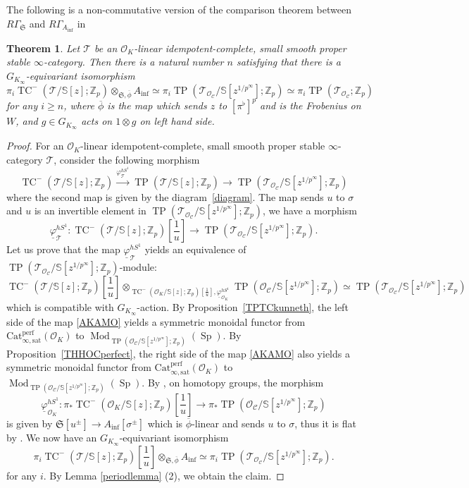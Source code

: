 \documentclass[11pt]{amsart}
\newcommand{\Z}{\mathbb{Z}}
\newcommand{\sO}{\mathcal{O}}
\newcommand{\sT}{\mathcal{T}}
\newcommand{\bS}{\mathbb{S}}
\newcommand{\Mod}{\operatorname{Mod}}
\newcommand{\TP}{\operatorname{TP}}
\newcommand{\TCn}{\operatorname{TC}^{-}}
\newcommand{\ol}{\overline}
\newcommand{\Ainf}{A_{\operatorname{inf}}}
\newcommand{\Cu}{\mathcal{C}}
\newcommand{\mS}{\mathfrak{S}}
\newcommand{\Catsat}{\operatorname{Cat_{\infty,sat}^{perf}}}
\newcommand{\Sp}{\operatorname{Sp}}
\newtheorem{thm}[lemma]{Theorem}
\theoremstyle{definition}
\theoremstyle{remark}
\numberwithin{equation}{section}
\begin{document}
The following is a non-commutative version of the comparison theorem between $R\Gamma_\mS$ and $R\Gamma_{\Ainf}$ in \cite[Theorem 1.2 (1)]{BMS2}
\begin{thm}\label{TPTCcomp}
Let $\sT$ be an $\sO_K$-linear idempotent-complete, small smooth proper stable $\infty$-category. Then there is a natural number $n$ satisfying that there is a $G_{K_\infty}$-equivariant isomorphism
\[
\pi_i \TCn(\sT/\bS[z];\Z_p)\otimes_{\mS,\ol{\phi}} \Ainf \simeq \pi_i \TP(\sT_{\sO_\Cu}/\bS[z^{1/p^{\infty}}];\Z_p)\simeq \pi_i \TP(\sT_{\sO_\Cu};\Z_p)
\]
for any $i \geq n$, where $\ol{\phi}$ is the map which sends $z$ to $[\pi^{\flat}]^p$ and is the Frobenius on $W$, and $g\in G_{K_\infty}$ acts on $1\otimes g$ on left hand side.
\end{thm}
\begin{proof}
For an $\sO_K$-linear idempotent-complete, small smooth proper stable $\infty$-category $\sT$, consider the following morphism
\[
\TCn(\sT/\bS[z];\Z_p) \overset{\varphi^{hS^1}_{\sT}}{\to} \TP(\sT/\bS[z];\Z_p) \to \TP(\sT_{\sO_\Cu}/\bS[z^{1/p^{\infty}}];\Z_p)
\]
where the second map is given by the diagram~\eqref{diagram}. The map sends $u$ to $\sigma$ and $u$ is an invertible element in $\TP(\sT_{\sO_\Cu}/\bS[z^{1/p^{\infty}}];\Z_p)$, we have a morphism
\begin{equation}
  \underline{\varphi}^{hS^1}_{\sT}:\TCn(\sT/\bS[z];\Z_p)[\frac{1}{u}] \to \TP(\sT_{\sO_\Cu}/\bS[z^{1/p^{\infty}}];\Z_p).
\end{equation}
Let us prove that the map $\underline{\varphi}^{hS^1}_{\sT}$ yields an equivalence of $\TP(\sT_{\sO_\Cu}/\bS[z^{1/p^{\infty}}];\Z_p)$-module:
\begin{equation}\label{AKAMO}
\TCn(\sT/\bS[z];\Z_p)[\frac{1}{u}] \otimes_{\TCn(\sO_K/\bS[z];\Z_p)[\frac{1}{u}],\underline{\varphi}^{hS^1}_{\sO_K}}\TP(\sO_{\Cu}/\bS[z^{1/p^{\infty}}];\Z_p)\simeq\TP(\sT_{\sO_\Cu}/\bS[z^{1/p^{\infty}}];\Z_p)
\end{equation}
which is compatible with $G_{K_\infty}$-action. By Proposition~\ref{TPTCkunneth}, the left side of the map \eqref{AKAMO} yields a symmetric monoidal functor from $\Catsat(\sO_K)$ to $\Mod_{\TP(\sO_{\Cu}/\bS[z^{1/p^{\infty}}];\Z_p)}(\Sp)$. By Proposition~\ref{THHOCperfect}, the right side of the map \eqref{AKAMO} also yields a symmetric monoidal functor from $\Catsat(\sO_K)$ to $\Mod_{\TP(\sO_{\Cu}/\bS[z^{1/p^{\infty}}];\Z_p)}(\Sp)$. By \cite[section 11]{BMS2}, on homotopy groups, the morphism
\[
\underline{\varphi}^{hS^1}_{\sO_K}:\pi_*\TCn(\sO_K/\bS[z];\Z_p)[\frac{1}{u}] \to \pi_*\TP(\sO_{\Cu}/\bS[z^{1/p^\infty}];\Z_p)
\]
is given by $\mS[u^{\pm}] \to \Ainf[\sigma^{\pm}]$ which is $\ol{\phi}$-linear and sends $u$ to $\sigma$, thus it is flat by \cite[Lemma 4.30]{BMS1}. We now have an $G_{K_\infty}$-equivariant isomorphism
\[
\pi_i\TCn(\sT/\bS[z];\Z_p)[\frac{1}{u}] \otimes_{\mS,\ol{\phi}} \Ainf\simeq \pi_i\TP(\sT_{\sO_\Cu}/\bS[z^{1/p^\infty}];\Z_p).
\]
for any $i$. By Lemma \ref{periodlemma} (2), we obtain the claim.
\end{proof}
\end{document}
